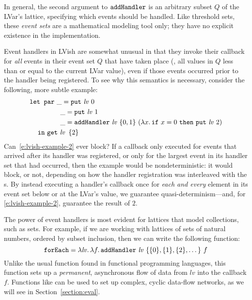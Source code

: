 In general, the second argument to ${\mbox{\texttt{addHandler}}}$ is an arbitrary subset $Q$ of the
LVar's lattice, specifying which events should be handled.  Like threshold
sets, these \emph{event sets} are a mathematical modeling tool only; they have no
explicit existence in the implementation.

Event handlers in LVish are somewhat unusual in that they invoke their
callback for \emph{all} events in their event set $Q$ that have taken place
(\ie, all values in $Q$ less than or equal to the current LVar value), even if
those events occurred prior to the handler being registered.  To see why
this semantics is necessary, consider the following, more subtle example:
\begin{equation}
\begin{split}
& \mbox{\texttt{\mbox{\texttt{let}}~\mbox{\texttt{par}}}} ~\_ = \mbox{\texttt{put}}~\mathit{lv}~0 \\
&  \hspace{4.2em} ~\_ = \mbox{\texttt{put}}~\mathit{lv}~1 \\
&  \hspace{4.2em} ~\_ = {\mbox{\texttt{addHandler}}}~\mathit{lv}~\{ 0, 1 \}~
     (\lambda x.\,\mbox{\texttt{if}}~x=0~\mbox{\texttt{then}}~\mbox{\texttt{put}}~\mathit{lv}~2) \\
&  \hspace{1.2em} \mbox{\texttt{in}}~ \mbox{\texttt{get}}~\mathit{lv}~\left\{2\right\}
\end{split}
\label{e:lvish-example-2}
\end{equation}
Can~\ref{e:lvish-example-2} ever block?  If a callback only executed for events
that arrived after its handler was registered, or only for the largest event in
its handler set that had occurred, then the example would be nondeterministic:
it would block, or not, depending on how the handler registration was
interleaved with the s.  By instead executing a handler's callback once
for \emph{each and every} element in its event set below or at the LVar's value, we
guarantee quasi-determinism---and, for \ref{e:lvish-example-2}, guarantee the
result of $2$.

The power of event handlers is most evident for lattices that model collections,
such as sets.  For example, if we are working with lattices of sets of natural
numbers, ordered by subset inclusion, then 
we can write the following function:
\[
\termfont{forEach} = \lam{\mathit{lv}}{
  \lam{f}{
    \ADDHANDLER~\mathit{lv}~\{ \{0\}, \{1\}, \{2\}, \dots \}~f
  }}
\]
Unlike the usual  function found in functional programming
languages, this function sets up a \emph{permanent}, asynchronous flow of data
from $\mathit{lv}$ into the callback $f$.  Functions like  can
be used to set up complex, cyclic data-flow networks, as we will see in
Section~\ref{section:eval}.

